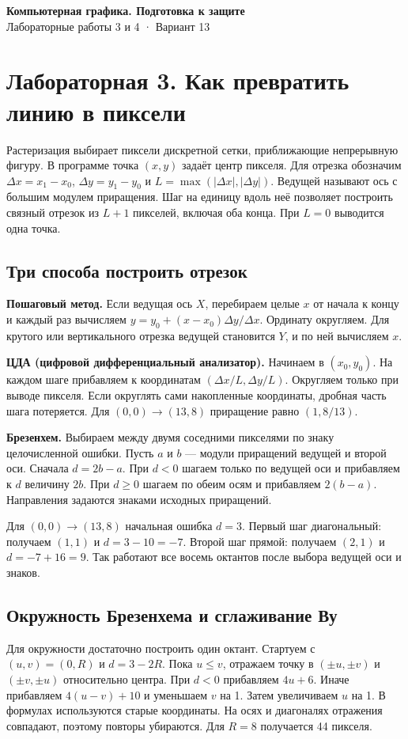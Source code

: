 \documentclass[11pt,a4paper]{extarticle}
\begin{document}
\begin{center}{\Large\bfseries Компьютерная графика. Подготовка к защите}\\Лабораторные работы 3 и 4 · Вариант 13\end{center}
\section*{Лабораторная 3. Как превратить линию в пиксели}
Растеризация выбирает пиксели дискретной сетки, приближающие непрерывную фигуру. В программе точка $(x,y)$ задаёт центр пикселя. Для отрезка обозначим $\Delta x=x_1-x_0$, $\Delta y=y_1-y_0$ и $L=\max(|\Delta x|,|\Delta y|)$. Ведущей называют ось с большим модулем приращения. Шаг на единицу вдоль неё позволяет построить связный отрезок из $L+1$ пикселей, включая оба конца. При $L=0$ выводится одна точка.
\subsection*{Три способа построить отрезок}
\textbf{Пошаговый метод.} Если ведущая ось $X$, перебираем целые $x$ от начала к концу и каждый раз вычисляем $y=y_0+(x-x_0)\Delta y/\Delta x$. Ординату округляем. Для крутого или вертикального отрезка ведущей становится $Y$, и по ней вычисляем $x$.

\textbf{ЦДА (цифровой дифференциальный анализатор).} Начинаем в $(x_0,y_0)$. На каждом шаге прибавляем к координатам $(\Delta x/L,\Delta y/L)$. Округляем только при выводе пикселя. Если округлять сами накопленные координаты, дробная часть шага потеряется. Для $(0,0)\to(13,8)$ приращение равно $(1,8/13)$.

\textbf{Брезенхем.} Выбираем между двумя соседними пикселями по знаку целочисленной ошибки. Пусть $a$ и $b$ --- модули приращений ведущей и второй оси. Сначала $d=2b-a$. При $d<0$ шагаем только по ведущей оси и прибавляем к $d$ величину $2b$. При $d\ge0$ шагаем по обеим осям и прибавляем $2(b-a)$. Направления задаются знаками исходных приращений.

Для $(0,0)\to(13,8)$ начальная ошибка $d=3$. Первый шаг диагональный: получаем $(1,1)$ и $d=3-10=-7$. Второй шаг прямой: получаем $(2,1)$ и $d=-7+16=9$. Так работают все восемь октантов после выбора ведущей оси и знаков.
\subsection*{Окружность Брезенхема и сглаживание Ву}
Для окружности достаточно построить один октант. Стартуем с $(u,v)=(0,R)$ и $d=3-2R$. Пока $u\le v$, отражаем точку в $(\pm u,\pm v)$ и $(\pm v,\pm u)$ относительно центра. При $d<0$ прибавляем $4u+6$. Иначе прибавляем $4(u-v)+10$ и уменьшаем $v$ на 1. Затем увеличиваем $u$ на 1. В формулах используются старые координаты. На осях и диагоналях отражения совпадают, поэтому повторы убираются. Для $R=8$ получается 44 пикселя.
\end{document}
